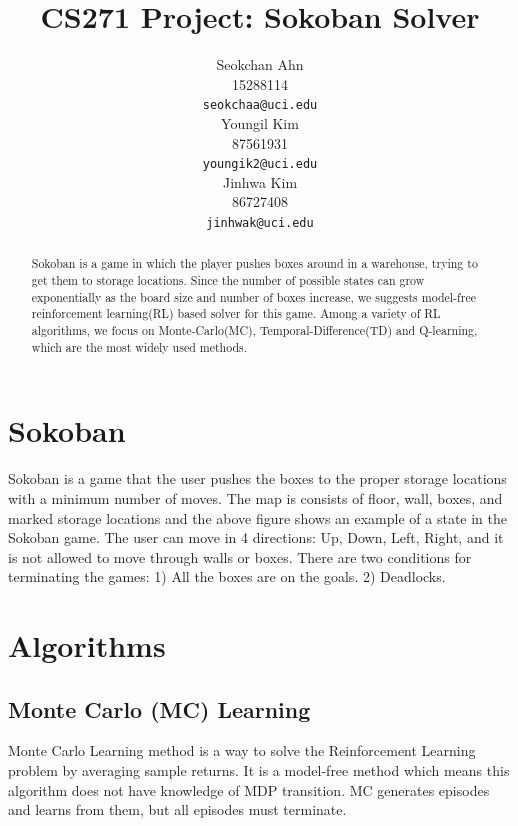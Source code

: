 \documentclass{article}
\title{CS271 Project: Sokoban Solver}
\author{
  Seokchan Ahn\\
  15288114 \\
  \texttt{seokchaa@uci.edu} \\
   \And
  Youngil Kim\\
  87561931\\
  \texttt{youngik2@uci.edu}\\
   \And
  Jinhwa Kim \\
  86727408 \\
  \texttt{jinhwak@uci.edu}
}
\begin{document}
\maketitle

\begin{abstract}
  Sokoban is a game in which the player pushes boxes around in a warehouse, trying to get them to storage locations. Since the number of possible states can grow exponentially as the board size and number of boxes increase, we suggests model-free reinforcement learning(RL) based solver for this game. Among a variety of RL algorithms, we focus on Monte-Carlo(MC), Temporal-Difference(TD) and Q-learning, which are the most widely used methods.
\end{abstract}

\section{Sokoban}
Sokoban is a game that the user pushes the boxes to the proper storage locations with a minimum number of moves. The map is consists of floor, wall, boxes, and marked storage locations and the above figure shows an example of a state in the Sokoban game. The user can move in 4 directions: Up, Down, Left, Right, and it is not allowed to move through walls or boxes. There are two conditions for terminating the games: 1) All the boxes are on the goals. 2) Deadlocks.

\section{Algorithms}

\subsection{Monte Carlo (MC) Learning}
Monte Carlo Learning method is a way to solve the Reinforcement Learning problem by averaging sample returns. It is a model-free method which means this algorithm does not have knowledge of MDP transition. MC generates episodes and learns from them, but all episodes must terminate.
\end{document}

